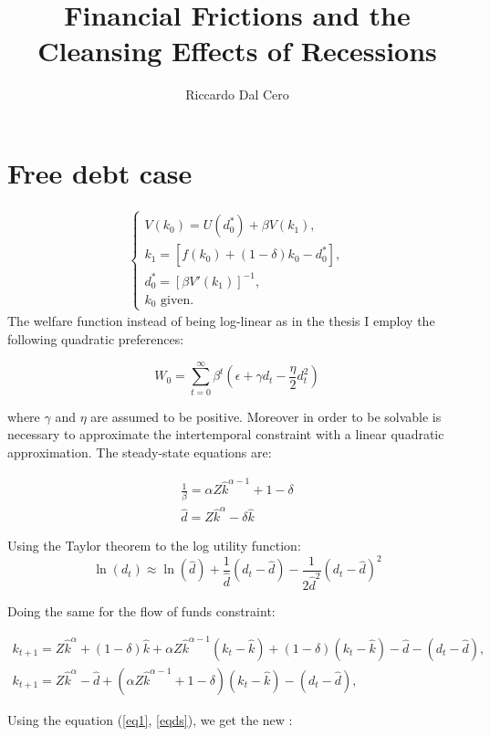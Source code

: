 \documentclass[12pt]{report}
\title{Financial Frictions and the Cleansing Effects of Recessions}
\author{Riccardo Dal Cero}
\begin{document}
\section{Free debt case}

\begin{align*}
    \begin{cases}
        V(k_0) = U(d_0^*) + \beta V(k_1), \\
        k_1 = \left[ f(k_{0}) + (1 - \delta) k_{0}  - d^*_0 \right] , \\
        d^*_0 = [\beta V'(k_{1})]^{-1},\\
        k_0 \text{ given.}
    \end{cases}
\end{align*}
The welfare function instead of being log-linear as in the thesis I employ the following quadratic preferences:

\begin{equation}
   W_0= \sum_{t=0}^{\infty}\beta^t\left(\epsilon + \gamma d_t - \frac{\eta}{2}d_t^2 \right)
\end{equation}

where \(\gamma\) and \(\eta\) are assumed to be positive. Moreover in order to be solvable is necessary to approximate
the intertemporal constraint with a linear quadratic approximation.
The steady-state equations are:

\begin{align}
    \frac{1}{\beta}=\alpha Z \hat{k}^{\alpha -1}+1-\delta \label{eq1}\\ 
    \widehat{d} =Z \hat{k}^{\alpha}-\delta \hat{k}\label{eqds}
\end{align}

Using the Taylor theorem to the log utility function:
\begin{equation}
    \ln(d_t) \approx \ln(\hat{d}) + \frac{1}{\hat{d}}(d_t - \hat{d}) - \frac{1}{2\hat{d}^2}(d_t - \hat{d})^2
\end{equation}


Doing the same for the flow of funds constraint:

\begin{align*}
    k_{t+1}= Z \hat{k}^{\alpha}+(1-\delta)\hat{k}+\alpha Z \hat{k}^{\alpha-1}(k_t-\hat{k})+(1-\delta)(k_t-\hat{k})-\hat{d}-(d_t-\hat{d}),\\
    k_{t+1}= Z \hat{k}^{\alpha} - \hat{d}+\left(\alpha Z \hat{k}^{\alpha-1} +1 -\delta\right)(k_t-\hat{k})-(d_t-\hat{d}),
\end{align*}

Using the equation (\ref{eq1}, \ref{eqds}), we get the new :
\end{document}

